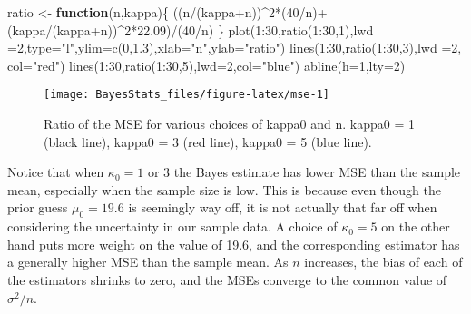 \documentclass[
]{book}
\newenvironment{Shaded}{\begin{snugshade}}{\end{snugshade}}
\newcommand{\AttributeTok}[1]{\textcolor[rgb]{0.77,0.63,0.00}{#1}}
\newcommand{\ControlFlowTok}[1]{\textcolor[rgb]{0.13,0.29,0.53}{\textbf{#1}}}
\newcommand{\DecValTok}[1]{\textcolor[rgb]{0.00,0.00,0.81}{#1}}
\newcommand{\FloatTok}[1]{\textcolor[rgb]{0.00,0.00,0.81}{#1}}
\newcommand{\FunctionTok}[1]{\textcolor[rgb]{0.00,0.00,0.00}{#1}}
\newcommand{\NormalTok}[1]{#1}
\newcommand{\OtherTok}[1]{\textcolor[rgb]{0.56,0.35,0.01}{#1}}
\newcommand{\SpecialCharTok}[1]{\textcolor[rgb]{0.00,0.00,0.00}{#1}}
\newcommand{\StringTok}[1]{\textcolor[rgb]{0.31,0.60,0.02}{#1}}
\begin{document}
\begin{Shaded}
\begin{Highlighting}[]
\NormalTok{ratio }\OtherTok{\textless{}{-}} \ControlFlowTok{function}\NormalTok{(n,kappa)\{}
\NormalTok{  ((n}\SpecialCharTok{/}\NormalTok{(kappa}\SpecialCharTok{+}\NormalTok{n))}\SpecialCharTok{\^{}}\DecValTok{2}\SpecialCharTok{*}\NormalTok{(}\DecValTok{40}\SpecialCharTok{/}\NormalTok{n)}\SpecialCharTok{+}\NormalTok{(kappa}\SpecialCharTok{/}\NormalTok{(kappa}\SpecialCharTok{+}\NormalTok{n))}\SpecialCharTok{\^{}}\DecValTok{2}\SpecialCharTok{*}\FloatTok{22.09}\NormalTok{)}\SpecialCharTok{/}\NormalTok{(}\DecValTok{40}\SpecialCharTok{/}\NormalTok{n)}
\NormalTok{\}}
\FunctionTok{plot}\NormalTok{(}\DecValTok{1}\SpecialCharTok{:}\DecValTok{30}\NormalTok{,}\FunctionTok{ratio}\NormalTok{(}\DecValTok{1}\SpecialCharTok{:}\DecValTok{30}\NormalTok{,}\DecValTok{1}\NormalTok{),}\AttributeTok{lwd =}\DecValTok{2}\NormalTok{,}\AttributeTok{type=}\StringTok{"l"}\NormalTok{,}\AttributeTok{ylim=}\FunctionTok{c}\NormalTok{(}\DecValTok{0}\NormalTok{,}\FloatTok{1.3}\NormalTok{),}\AttributeTok{xlab=}\StringTok{"n"}\NormalTok{,}\AttributeTok{ylab=}\StringTok{"ratio"}\NormalTok{)}
\FunctionTok{lines}\NormalTok{(}\DecValTok{1}\SpecialCharTok{:}\DecValTok{30}\NormalTok{,}\FunctionTok{ratio}\NormalTok{(}\DecValTok{1}\SpecialCharTok{:}\DecValTok{30}\NormalTok{,}\DecValTok{3}\NormalTok{),}\AttributeTok{lwd =}\DecValTok{2}\NormalTok{, }\AttributeTok{col=}\StringTok{"red"}\NormalTok{)}
\FunctionTok{lines}\NormalTok{(}\DecValTok{1}\SpecialCharTok{:}\DecValTok{30}\NormalTok{,}\FunctionTok{ratio}\NormalTok{(}\DecValTok{1}\SpecialCharTok{:}\DecValTok{30}\NormalTok{,}\DecValTok{5}\NormalTok{),}\AttributeTok{lwd=}\DecValTok{2}\NormalTok{,}\AttributeTok{col=}\StringTok{"blue"}\NormalTok{)}
\FunctionTok{abline}\NormalTok{(}\AttributeTok{h=}\DecValTok{1}\NormalTok{,}\AttributeTok{lty=}\DecValTok{2}\NormalTok{)}
\end{Highlighting}
\end{Shaded}

\begin{figure}

{\centering \texttt{[image: BayesStats\_files/figure-latex/mse-1]} 

}

\caption{Ratio of the MSE for various choices of kappa0 and n. kappa0 = 1 (black line), kappa0 = 3 (red line), kappa0 = 5 (blue line).}\label{fig:mse}
\end{figure}

Notice that when \(\kappa_0 = 1\) or \(3\) the Bayes estimate has lower MSE than the sample mean, especially when the sample size is low. This is because even though the prior guess \(\mu_0 = 19.6\) is seemingly way off, it is not actually that far
off when considering the uncertainty in our sample data. A choice of \(\kappa_0 = 5\) on the other hand puts more weight on the value of 19.6, and the corresponding estimator has a generally higher MSE than the sample mean. As \(n\) increases, the bias of each of the estimators shrinks to zero, and the MSEs converge to the common value of \(\sigma^2/n\).

  
\end{document}
